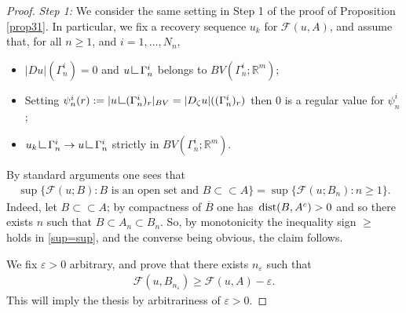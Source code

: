 \documentclass[a4paper,11pt]{article}
\numberwithin{equation}{section}
\def\dist{\,{\rm dist}}
\newcommand{\R}{\mathbb{R}}
\newcommand{\res}      {\mathop{\hbox{\vrule height 7pt width .5pt depth
                        0pt\vrule height .5pt width 6pt depth 0pt}}\nolimits}
\begin{document}
\begin{proof}
 \textit{Step 1:}
	We consider the same setting in Step 1 of the proof of Proposition \ref{prop31}. In particular, we fix a recovery sequence $u_k$ for $\mathcal F(u,A)$, and assume that, for all $n\geq 1$, and $i=1,\dots,N_n$,
	\begin{itemize}
		\item[(a)] $|Du|(\Gamma_n^i)=0$ and $u\res \Gamma_n^i$ belongs to $BV(\Gamma_n^i;\R^m)$;
		\item[(b)] Setting $\psi_n^i(r):=|u\res ( \Gamma_n^i)_r|_{BV}=|D_\zeta u|((\Gamma_n^i)_r)$ then $0$ is a regular value for $\psi_n^i$;
		\item[(c)]  $u_k\res \Gamma_n^i\rightarrow u\res \Gamma_n^i$ strictly in $BV(\Gamma_n^i;\R^m)$.
	\end{itemize}
By standard arguments one sees that 
\begin{align}\label{sup=sup}
	\sup\{\mathcal F(u;B):B\text{ is an open set and }B\subset\subset A\}=
	\sup\{\mathcal F(u;B_n):n\geq 1\}.
\end{align}
Indeed,  let $B\subset\subset A$;
by compactness of $\overline B$ one has $\dist(B,A^c)>0$ and so there exists $n$ such that $B\subset A_{n}\subset B_{n}$. 
So, by monotonicity the inequality sign $\geq$ holds in \eqref{sup=sup}, and the converse being obvious, the claim follows.

We fix $\varepsilon>0$ arbitrary, and prove that there exists $n_\varepsilon$ such that  
\begin{align}
	\mathcal F(u,B_{n_\varepsilon})\geq\mathcal F(u,A)-\varepsilon.
\end{align}
This will imply the thesis by arbitrariness of $\varepsilon>0$.



\end{proof}
\end{document}
